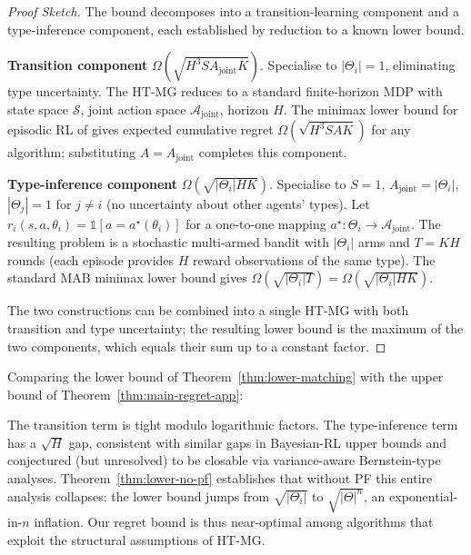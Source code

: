 \begin{proof}[Proof Sketch]
The bound decomposes into a transition-learning component and a type-inference component, each established by reduction to a known lower bound.

\textbf{Transition component} $\Omega(\sqrt{H^3 S A_{\mathrm{joint}} K})$. Specialise to $|\Theta_i| = 1$, eliminating type uncertainty. The HT-MG reduces to a standard finite-horizon MDP with state space $\mathcal{S}$, joint action space $\mathcal{A}_{\mathrm{joint}}$, horizon $H$. The minimax lower bound for episodic RL of \citet[Theorem 1]{domingues2021episodic} gives expected cumulative regret $\Omega(\sqrt{H^3 S A K})$ for any algorithm; substituting $A = A_{\mathrm{joint}}$ completes this component.

\textbf{Type-inference component} $\Omega(\sqrt{|\Theta_i| H K})$. Specialise to $S = 1$, $A_{\mathrm{joint}} = |\Theta_i|$, $|\Theta_j| = 1$ for $j \neq i$ (no uncertainty about other agents' types). Let $r_i(s, a, \theta_i) = \mathbb{1}[a = a^\star(\theta_i)]$ for a one-to-one mapping $a^\star \colon \Theta_i \to \mathcal{A}_{\mathrm{joint}}$. The resulting problem is a stochastic multi-armed bandit with $|\Theta_i|$ arms and $T = KH$ rounds (each episode provides $H$ reward observations of the same type). The standard MAB minimax lower bound \citep[Theorem 15.2]{lattimore2020bandit} gives $\Omega(\sqrt{|\Theta_i| T}) = \Omega(\sqrt{|\Theta_i| HK})$.

The two constructions can be combined into a single HT-MG with both transition and type uncertainty; the resulting lower bound is the maximum of the two components, which equals their sum up to a constant factor.
\end{proof}

Comparing the lower bound of Theorem~\ref{thm:lower-matching} with the upper bound of Theorem~\ref{thm:main-regret-app}:
\begin{center}
\end{center}
The transition term is tight modulo logarithmic factors. The type-inference term has a $\sqrt{H}$ gap, consistent with similar gaps in Bayesian-RL upper bounds and conjectured (but unresolved) to be closable via variance-aware Bernstein-type analyses. Theorem~\ref{thm:lower-no-pf} establishes that without PF this entire analysis collapses: the lower bound jumps from $\sqrt{|\Theta_i|}$ to $\sqrt{|\Theta|^n}$, an exponential-in-$n$ inflation. Our regret bound is thus near-optimal among algorithms that exploit the structural assumptions of HT-MG.



